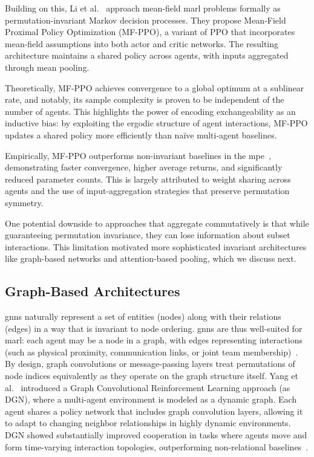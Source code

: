Building on this, Li et al.~\cite{li2021b} approach mean-field \gls{marl} 
problems formally as permutation-invariant Markov decision processes. 
They propose Mean-Field Proximal Policy Optimization (MF-PPO), 
a variant of PPO that incorporates mean-field assumptions into 
both actor and critic networks. The resulting architecture maintains a 
shared policy across agents, with inputs aggregated through mean pooling.

Theoretically, MF-PPO achieves convergence to a global optimum at 
a sublinear rate, and notably, its sample complexity is proven to be 
independent of the number of agents. This highlights the power of 
encoding exchangeability as an inductive bias: by exploiting the 
ergodic structure of agent interactions, MF-PPO updates a shared policy 
more efficiently than na\"ive multi-agent baselines.

Empirically, MF-PPO outperforms non-invariant baselines in the 
\gls{mpe}~\cite{li2021b}, demonstrating faster convergence, 
higher average returns, and significantly reduced parameter counts. 
This is largely attributed to weight sharing across agents and the 
use of input-aggregation strategies that preserve permutation symmetry. 

One potential downside to approaches that aggregate commutatively
is that while guaranteeing permutation invariance, 
they can lose information about subset interactions. 
This limitation motivated more sophisticated invariant architectures like 
graph-based networks and attention-based pooling, which we discuss next.


\subsection{Graph-Based Architectures}

\Glspl{gnn} naturally represent a set of entities (nodes) along with 
their relations (edges) in a way that is invariant to node ordering. 
\Glspl{gnn} are thus well-suited for \gls{marl}: each agent may be a node in a graph, 
with edges representing interactions (such as physical proximity, 
communication links, or joint team membership)~\cite{liu2020b}. 
By design, graph convolutions or message-passing layers treat permutations of 
node indices equivalently as they operate on the graph structure itself. 
Yang et al.~\cite{yang2021a} introduced a Graph Convolutional Reinforcement Learning 
approach (as DGN), where a multi-agent environment is modeled as a dynamic graph. 
Each agent shares a policy network that includes graph convolution layers, 
allowing it to adapt to changing neighbor relationships in highly dynamic environments. 
DGN showed substantially improved cooperation in tasks where agents move and form time-varying 
interaction topologies, outperforming non-relational baselines~\cite{yang2021a}. 

